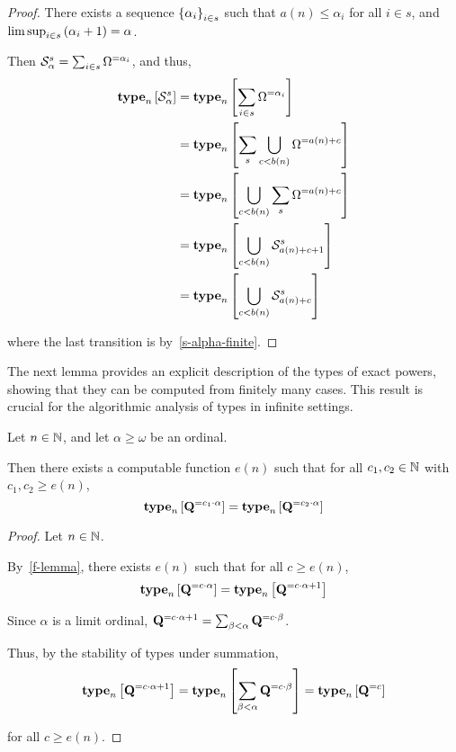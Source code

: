 \begin{proof}
    There exists a sequence $\left\{ {\alpha_i} \right\}_{i \in s}$ such that
    $a(n) \le \alpha_i$ for all $i \in s$,
    and $\limsup_{i \in s} \left( {\alpha_i + 1} \right) = \alpha$.

    Then $\mathcal{S}^{s}_{\alpha} = \sum_{i \in s} \Omega^{= \alpha_i}$,
    and thus,
    \begin{align*}
        \mathbf{type}_{n} \left[ {\mathcal{S}^{s}_{\alpha}} \right]
        &= \mathbf{type}_{n} \left[ {\sum_{i \in s} \Omega^{= \alpha_i}} \right] \\
        &= \mathbf{type}_{n} \left[ {\sum_{s} \bigcup_{c < b(n)}{\Omega^{= a(n) + c}}} \right] \\
        &= \mathbf{type}_{n} \left[ {\bigcup_{c < b(n)}{\sum_{s} \Omega^{= a(n) + c}}} \right] \\
        &= \mathbf{type}_{n} \left[ {\bigcup_{c < b(n)}{\mathcal{S}^{s}_{a(n) + c + 1}}} \right] \\
        &= \mathbf{type}_{n} \left[ {\bigcup_{c < b(n)}{\mathcal{S}^{s}_{a(n) + c}}} \right] \\
    \end{align*}

    where the last transition is by~\cref{s-alpha-finite}.

\end{proof}

The next lemma provides an explicit description of the types of exact powers, showing that they can be computed from
finitely many cases. This result is crucial for the algorithmic analysis of types in infinite settings.

\begin{lemma}
    Let $n \in \mathbb{N}$, and let $\alpha \ge \omega$ be an ordinal.

    Then there exists a computable function $e(n)$ such that
    for all $c_1, c_2 \in \mathbb{N}$ with $c_1, c_2 \ge e(n)$,
    \[\mathbf{type}_{n} \left[ {\mathbf{Q}^{= c_1 \cdot \alpha}} \right] = \mathbf{type}_{n} \left[ {\mathbf{Q}^{= c_2 \cdot \alpha}} \right]\]
\end{lemma}

\begin{proof}
    Let $n \in \mathbb{N}$.

    By~\cref{f-lemma}, there exists $e(n)$ such that
    for all $c \ge e(n)$,
    \[\mathbf{type}_{n} \left[ {\mathbf{Q}^{= c \cdot \alpha}} \right] = \mathbf{type}_{n} \left[ {\mathbf{Q}^{= c \cdot \alpha + 1}} \right]\]

    Since $\alpha$ is a limit ordinal,
    $\mathbf{Q}^{= c \cdot \alpha + 1} = \sum_{\beta < \alpha}{\mathbf{Q}^{= c \cdot \beta}}$.

    Thus, by the stability of types under summation,
    \[\mathbf{type}_{n} \left[ {\mathbf{Q}^{= c \cdot \alpha + 1}} \right] = \mathbf{type}_{n} \left[ {\sum_{\beta < \alpha}{\mathbf{Q}^{= c \cdot \beta}}} \right] = \mathbf{type}_{n} \left[ {\mathbf{Q}^{= c}} \right]\]

    for all $c \ge e(n)$.
\end{proof}


